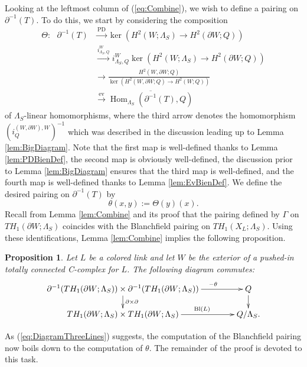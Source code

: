 \documentclass[11pt,a4paper]{amsart}
\newtheorem{proposition}[theorem]{Proposition}
\theoremstyle{definition}
\DeclareMathOperator{\Hom}{Hom}
\begin{document}
Looking at the leftmost column of (\ref{eq:Combine}), we wish to define a pairing on $\partial^{-1}(T)$. To do this, we start by considering the composition
\begin{align*}
\Theta \colon \ \ \ \partial^{-1}(T)
&\stackrel{\text{PD}}{\longrightarrow} \ker(H^2(W;\Lambda_S) \to H^2(\partial W;Q))   \\
&\stackrel{i^W_{\Lambda_S,Q}}{\longrightarrow} i^W_{\Lambda_S,Q} \ker(H^2(W;\Lambda_S) \to H^2(\partial W;Q))\\
&\longrightarrow  \frac{H^2(W,\partial W;Q)}{\ker(H^2(W,\partial W;Q) \to H^2(W;Q)) } \\
&\stackrel{\text{ev}}{\longrightarrow}  \overline{ \Hom_{\Lambda_S}(\partial^{-1}(T),Q) }
\end{align*}
of $\Lambda_S$-linear homomorphisms, where the third arrow denotes the homomorphism $(i_Q^{(W,\partial W),W})^{-1}$ which was described in the discussion leading up to Lemma \ref{lem:BigDiagram}. Note that the first map is well-defined thanks to Lemma \ref{lem:PDBienDef}, the second map is obviously well-defined, the discussion prior to Lemma \ref{lem:BigDiagram} ensures that the third map is well-defined, and the fourth map is well-defined thanks to Lemma \ref{lem:EvBienDef}. We define the desired pairing on $ \partial^{-1}(T)$ by 
$$\theta(x,y):=\Theta(y)(x).$$
Recall from Lemma \ref{lem:Combine} and its proof that the pairing defined by $\Gamma$ on $TH_1(\partial W;\Lambda_S)$ coincides with the Blanchfield pairing on $TH_1(X_L;\Lambda_S)$. Using these identifications, Lemma \ref{lem:Combine} implies the following proposition.

\begin{proposition}
\label{prop:ReduceToTheta}
Let $L$ be a colored link and let $W$ be the exterior of a pushed-in totally connected C-complex for $L$. The following diagram commutes:
\begin{equation}
\label{eq:DiagramThreeLines}
\xymatrix@C1.4cm@R0.5cm{ 
\partial^{-1}(TH_1(\partial W;\Lambda_S)) \times \partial^{-1}(TH_1(\partial W;\Lambda_S)) \ar[r]^{\ \ \ \ \ \ \ \ \ \ \ \ \ \ \ \ \ \ \ \  -\theta}\ar[d]^{\partial \times \partial } & Q \ar[d]   \\
TH_1(\partial W;\Lambda_S) \times TH_1(\partial W;\Lambda_S) \ar[r]^{\ \ \ \ \ \ \ \ \ \  \ \ \operatorname{Bl}(L)}& Q/\Lambda_S.
}
\end{equation} 
\end{proposition}

As (\ref{eq:DiagramThreeLines}) suggests, the computation of the Blanchfield pairing now boils down to the computation of $\theta$. The remainder of the proof is devoted to this task.
\end{document}

